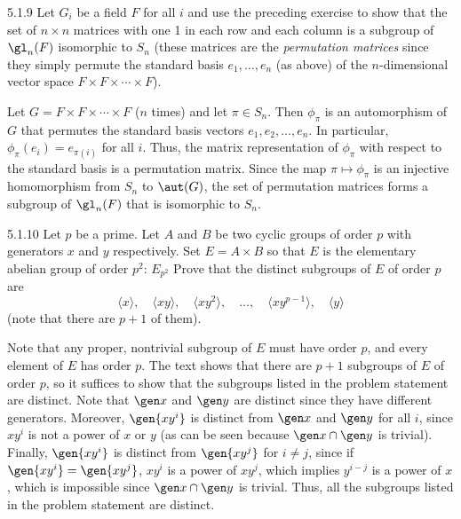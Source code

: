 \begin{exercise}{5.1.9}
    Let $G_i$ be a field $F$ for all $i$ and use the preceding exercise to show that the set of $n \times n$ matrices with one 1 in each row and each column is a subgroup of $\gl_n(F)$ isomorphic to $S_n$ (these matrices are the \emph{permutation matrices} since they simply permute the standard basis $e_1, \ldots, e_n$ (as above) of the $n$-dimensional vector space $F \times F \times \cdots \times F$).
\end{exercise}

\begin{sol}
    Let $G = F \times F \times \cdots \times F$ ($n$ times) and let $\pi \in S_n$.
	Then $\phi_\pi$ is an automorphism of $G$ that permutes the standard basis vectors $e_1, e_2, \ldots, e_n$.
	In particular, $\phi_\pi(e_i) = e_{\pi(i)}$ for all $i$.
	Thus, the matrix representation of $\phi_\pi$ with respect to the standard basis is a permutation matrix.
	Since the map $\pi \mapsto \phi_\pi$ is an injective homomorphism from $S_n$ to $\aut(G)$, the set of permutation matrices forms a subgroup of $\gl_n(F)$ that is isomorphic to $S_n$.
\end{sol}

\begin{exercise}{5.1.10}
    Let $p$ be a prime.
	Let $A$ and $B$ be two cyclic groups of order $p$ with generators $x$ and $y$ respectively.
	Set $E = A \times B$ so that $E$ is the elementary abelian group of order $p^2$: $E_{p^2}$ Prove that the distinct subgroups of $E$ of order $p$ are
    \[
    	\langle x \rangle, \quad \langle xy \rangle, \quad \langle xy^2 \rangle, \quad \ldots, \quad \langle xy^{p-1} \rangle, \quad \langle y \rangle
    \]
	(note that there are $p + 1$ of them).
\end{exercise}

\begin{sol}
    Note that any proper, nontrivial subgroup of $E$ must have order $p$, and every element of $E$ has order $p$.
	The text shows that there are $p + 1$ subgroups of $E$ of order $p$, so it suffices to show that the subgroups listed in the problem statement are distinct.
	Note that $\gen x$ and $\gen y$ are distinct since they have different generators.
	Moreover, $\gen{xy^i}$ is distinct from $\gen x$ and $\gen y$ for all $i$, since $xy^i$ is not a power of $x$ or $y$ (as can be seen because $\gen x \cap \gen y$ is trivial).
	Finally, $\gen{xy^i}$ is distinct from $\gen{xy^j}$ for $i \neq j$, since if $\gen{xy^i} = \gen{xy^j}$, $xy^i$ is a power of $xy^j$, which implies $y^{i-j}$ is a power of $x$, which is impossible since $\gen x \cap \gen y$ is trivial.
	Thus, all the subgroups listed in the problem statement are distinct.
\end{sol}

